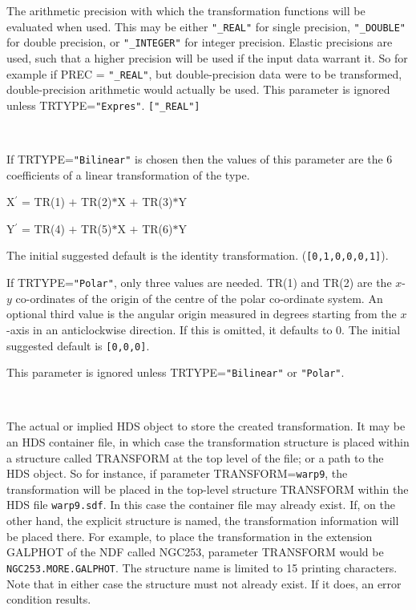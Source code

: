 \documentclass[twoside,11pt]{article}
\newcommand{\sstsubsection}[1]{ \item[{#1}] \mbox{} \\}
\newcommand{\sstsubsection}[1]{\item[{#1}]}
\begin{document}
{{{         The arithmetic precision with which the transformation
         functions will be evaluated when used.  This may be either
         {\tt "\_REAL"} for single precision, {\tt "\_DOUBLE"} for
         double precision, or {\tt "\_INTEGER"} for integer precision.
         Elastic precisions are used, such that a higher precision will
         be used if the input
         data warrant it.  So for example if PREC = {\tt "\_REAL"}, but
         double-precision data were to be transformed, double-precision
         arithmetic would actually be used.  This parameter is
         ignored unless TRTYPE={\tt "Expres"}.  {\tt ["\_REAL"]}
      }
      \sstsubsection{
         TR( 6 ) = \_DOUBLE (Read)
      }{
         If TRTYPE={\tt "Bilinear"} is chosen then the values of this
         parameter are the 6 coefficients of a linear transformation of
         the type.
         \begin{description}
         \item X$^\prime$ = TR(1) $+$ TR(2)$*$X $+$ TR(3)$*$Y
         \item Y$^\prime$ = TR(4) $+$ TR(5)$*$X $+$ TR(6)$*$Y
         \end{description}
         The initial suggested default is the identity transformation.
         ({\tt [0,1,0,0,0,1]}).

         If TRTYPE={\tt "Polar"}, only three values are needed.  TR(1) and
         TR(2) are the $x$-$y$ co-ordinates of the origin of the centre of
         the polar co-ordinate system.  An optional third value is
         the angular origin measured in degrees starting from the
         $x$-axis in an anticlockwise direction.  If this is omitted, it
         defaults to 0.  The initial suggested default is {\tt [0,0,0]}.

         This parameter is ignored unless TRTYPE={\tt "Bilinear"} or
         {\tt "Polar"}.
      }
      \sstsubsection{
         TRANSFORM = TRN (Write)
      }{
         The actual or implied HDS object to store the created
         transformation.  It may be an HDS container file, in which
         case the transformation structure is placed within a structure
         called TRANSFORM at the top level of the file; or a path to
         the HDS object.  So for instance, if parameter
         TRANSFORM={\tt warp9}, the transformation will be placed in
         the top-level structure TRANSFORM within the HDS file
         {\tt warp9.sdf}.  In this case the container file may already
         exist.  If, on the other hand, the explicit structure is
         named, the transformation information will be placed there.
         For example, to place the transformation in the extension
         GALPHOT of the NDF called NGC253, parameter TRANSFORM would be
         {\tt NGC253.MORE.GALPHOT}.  The structure name is limited to 15
         printing characters.  Note that in either case the structure
         must not already exist.  If it does, an error condition
         results.

}}}
\end{document}
